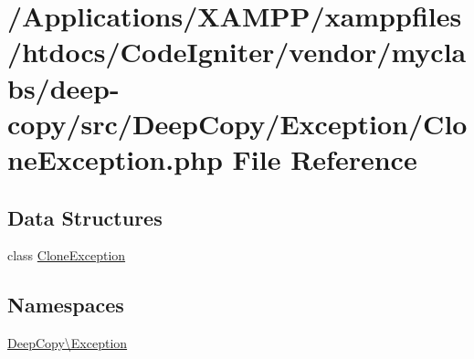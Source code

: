 \hypertarget{_clone_exception_8php}{}\section{/\+Applications/\+X\+A\+M\+P\+P/xamppfiles/htdocs/\+Code\+Igniter/vendor/myclabs/deep-\/copy/src/\+Deep\+Copy/\+Exception/\+Clone\+Exception.php File Reference}
\label{_clone_exception_8php}
\subsection*{Data Structures}
\begin{DoxyCompactItemize}
\item 
class \mbox{\hyperlink{class_deep_copy_1_1_exception_1_1_clone_exception}{Clone\+Exception}}
\end{DoxyCompactItemize}
\subsection*{Namespaces}
\begin{DoxyCompactItemize}
\item 
 \mbox{\hyperlink{namespace_deep_copy_1_1_exception}{Deep\+Copy\textbackslash{}\+Exception}}
\end{DoxyCompactItemize}
